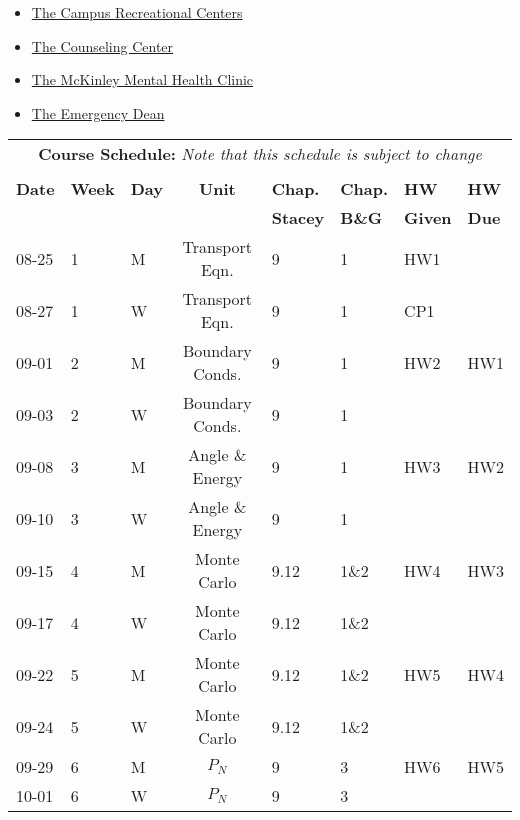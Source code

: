\documentclass[11pt, a4paper]{article}
\begin{document}
\begin{itemize}
\item \href{https://campusrec.illinois.edu/}{The Campus Recreational Centers}
\item \href{http://counselingcenter.illinois.edu/}{The Counseling Center}
\item \href{http://odos.illinois.edu/emergency/}{The McKinley Mental Health Clinic}
\item \href{https://odos.illinois.edu/community-of-care/emergency-dean}{The Emergency Dean}
\end{itemize}


\pagebreak
\FloatBarrier
\renewcommand{\arraystretch}{1}
\begin{table}[h]
\begin{center}
\begin{tabular}{lllcllll}
\multicolumn{8}{c}{\textbf{Course Schedule:}\textit{ Note that this schedule is subject to change}}\\
&&&&&&&\\
\textbf{Date} & \textbf{Week} & \textbf{Day} & \textbf{Unit} & \textbf{Chap.} & \textbf{Chap.} & \textbf{HW} & \textbf{HW}\\
              &  &  & & \textbf{Stacey}& \textbf{B\&G} & \textbf{Given} & \textbf{Due}\\
\hline
\hline
08-25 & 1 & M  & Transport Eqn.          & 9    & 1    & HW1 &     \\
08-27 & 1 & W  & Transport Eqn.          & 9    & 1    & CP1 &     \\
09-01 & 2 & M  & Boundary Conds.         & 9    & 1    & HW2 & HW1 \\
09-03 & 2 & W  & Boundary Conds.         & 9    & 1    &     &     \\
09-08 & 3 & M  & Angle \& Energy         & 9    & 1    & HW3 & HW2 \\
09-10 & 3 & W  & Angle \& Energy         & 9    & 1    &     &     \\
09-15 & 4 & M  & Monte Carlo             & 9.12 & 1\&2 & HW4 & HW3 \\
09-17 & 4 & W  & Monte Carlo             & 9.12 & 1\&2 &     &     \\
09-22 & 5 & M  & Monte Carlo             & 9.12 & 1\&2 & HW5 & HW4 \\
09-24 & 5 & W  & Monte Carlo             & 9.12 & 1\&2 &     &     \\
09-29 & 6 & M  & $P_N$                   & 9    & 3    & HW6 & HW5 \\
10-01 & 6 & W  & $P_N$                   & 9    & 3    &     &     \\

\end{tabular}
\end{center}
\end{table}
\end{document}

